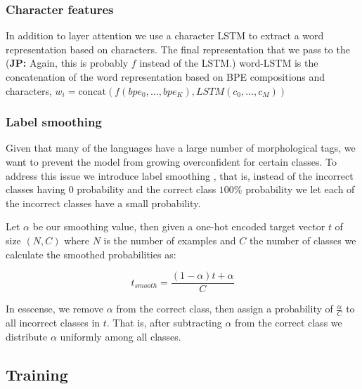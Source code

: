 \documentclass[11pt]{article}
\newcommand\jp[1]{(\textbf{JP:} #1)}
\begin{document}
	\subsubsection{Character features}
	In addition to layer attention we use a character LSTM to
        extract a word representation based on characters. The final
        representation that we pass to the \jp{Again, this is probably
          $f$ instead of the LSTM.} word-LSTM is the concatenation of
        the word representation based on BPE compositions and
        characters,
        $w_i = \text{concat}(f(bpe_0,...,bpe_K), LSTM(c_0, ..., c_M))$
	
	\subsubsection{Label smoothing}
    	Given that many of the languages have a large number of
     morphological tags, we want to prevent the model from growing
     overconfident for certain classes. To address this issue we
     introduce label smoothing \citep{szegedy2016rethinking}, that is,
     instead of the incorrect classes having 0 probability and the
     correct class $100\%$ probability we let each of the incorrect
     classes have a small probability.


                Let $\alpha$ be our smoothing value, then given a
     one-hot encoded target vector $t$ of size $(N,C)$ where $N$ is
     the number of examples and $C$ the number of classes we calculate
     the smoothed probabilities as:

    \begin{equation}
        t_{smooth} = \frac{(1-\alpha)t + \alpha}{C}
    \end{equation}

                In esscense, we remove $\alpha$ from the correct
     class, then assign a probability of $\frac{\alpha}{C}$ to all
     incorrect classes in $t$. That is, after subtracting $\alpha$
     from the correct class we distribute $\alpha$ uniformly among all
     classes.

	\subsection{Training}
	
\end{document}
